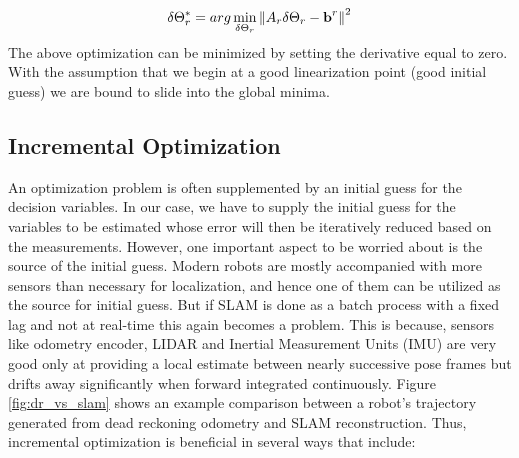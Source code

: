 \begin{equation}
\delta\Theta^*_r = arg \min_{\delta\Theta_r}\left\lVert A_r\delta\Theta_r - \textbf{b}^r\right\rVert^2
\label{eq:multisimplifiedopt}
\end{equation}
The above optimization can be minimized by setting the derivative equal to zero. With the assumption that we begin at a good linearization point (good initial guess) we are bound to slide into the global minima. 

\subsection{Incremental Optimization}
An optimization problem is often supplemented by an initial guess for the decision variables. In our case, we have to supply the initial guess for the variables to be estimated whose error will then be iteratively reduced based on the measurements. However, one important aspect to be worried about is the source of the initial guess. Modern robots are mostly accompanied with more sensors than necessary for localization, and hence one of them can be utilized as the source for initial guess. But if SLAM is done as a batch process with a fixed lag and not at real-time this again becomes a problem. This is because, sensors like odometry encoder, LIDAR and Inertial Measurement Units (IMU) are very good only at providing a local estimate between nearly successive pose frames but drifts away significantly when forward integrated continuously. Figure \ref{fig:dr_vs_slam} shows an example comparison between a robot's trajectory generated from dead reckoning odometry and SLAM reconstruction. Thus, incremental optimization is beneficial in several ways that include:
